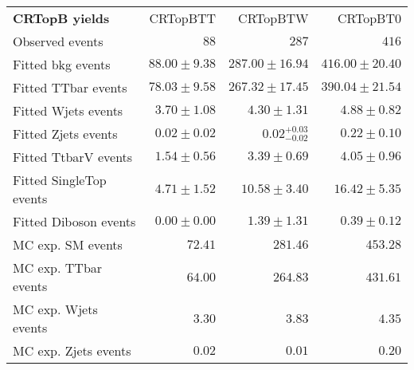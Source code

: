 

\begin{table}
\begin{center}
\setlength{\tabcolsep}{0.0pc}
{\small
\begin{tabular*}{\textwidth}{@{\extracolsep{\fill}}lrrr}
\noalign{\smallskip}\hline\noalign{\smallskip}
{\bf CRTopB yields}           & CRTopBTT            & CRTopBTW            & CRTopBT0              \\[-0.05cm]
\noalign{\smallskip}\hline\noalign{\smallskip}
Observed events          & $88$              & $287$              & $416$                    \\
\noalign{\smallskip}\hline\noalign{\smallskip}
Fitted bkg events         & $88.00 \pm 9.38$          & $287.00 \pm 16.94$          & $416.00 \pm 20.40$              \\
\noalign{\smallskip}\hline\noalign{\smallskip}
        Fitted TTbar events         & $78.03 \pm 9.58$          & $267.32 \pm 17.45$          & $390.04 \pm 21.54$              \\
        Fitted Wjets events         & $3.70 \pm 1.08$          & $4.30 \pm 1.31$          & $4.88 \pm 0.82$              \\
        Fitted Zjets events         & $0.02 \pm 0.02$          & $0.02_{-0.02}^{+0.03}$          & $0.22 \pm 0.10$              \\
        Fitted TtbarV events         & $1.54 \pm 0.56$          & $3.39 \pm 0.69$          & $4.05 \pm 0.96$              \\
        Fitted SingleTop events         & $4.71 \pm 1.52$          & $10.58 \pm 3.40$          & $16.42 \pm 5.35$              \\
        Fitted Diboson events         & $0.00 \pm 0.00$          & $1.39 \pm 1.31$          & $0.39 \pm 0.12$              \\
 \noalign{\smallskip}\hline\noalign{\smallskip}
MC exp. SM events              & $72.41$          & $281.46$          & $453.28$              \\
\noalign{\smallskip}\hline\noalign{\smallskip}
        MC exp. TTbar events         & $64.00$          & $264.83$          & $431.61$              \\
        MC exp. Wjets events         & $3.30$          & $3.83$          & $4.35$              \\
        MC exp. Zjets events         & $0.02$          & $0.01$          & $0.20$              \\

\end{tabular*}}
\end{center}
\end{table}

